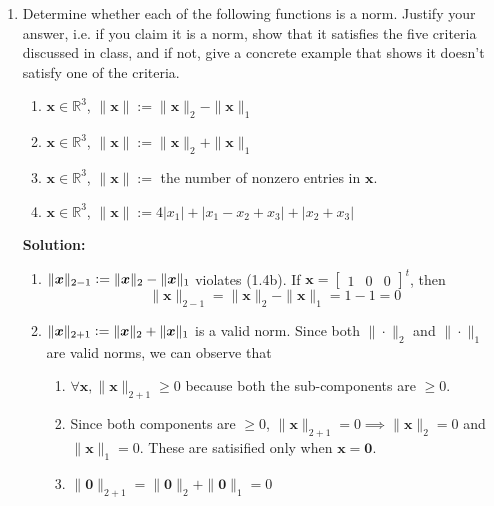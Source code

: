 \documentclass[]{article}
\newcommand{\R}{\mathbb{R}}
\newcommand{\bbm}{\begin{bmatrix}}
\newcommand{\ebm}{\end{bmatrix}}
\newcommand{\defeq}{\vcentcolon=}
\newcommand{\solution}{\vskip 0.5cm \textbf{\large Solution:} \\}
\begin{document}
\begin{enumerate}[resume]
  
\item Determine whether each of the following functions is a norm. Justify your answer, i.e. if you claim it is a norm, show that it satisfies the five criteria discussed in class, and if not, give a concrete example that shows it doesn't satisfy one of the criteria.
  
  \begin{enumerate}
  \item $\bm{x}\in\R^3$, $\|\bm{x}\| := \|\bm{x}\|_2-\|\bm{x}\|_1$
  \item $\bm{x}\in\R^3$, $\|\bm{x}\| := \|\bm{x}\|_2 + \|\bm{x}\|_1$
  \item $\bm{x}\in\R^3$, $\|\bm{x}\| := $ the number of nonzero entries in $\bm{x}$.
  \item $\bm{x}\in\R^3$, $\|\bm{x}\| := 4|x_1| + |x_1-x_2+x_3| + |x_2+x_3|$
  \end{enumerate}
  
  \solution
  \begin{enumerate}
  \item $\|\bm{x}\|_{2-1} \defeq \|\bm{x}\|_2-\|\bm{x}\|_1$ violates (1.4b). If $\bm{x} = \bbm 1 & 0 & 0 \ebm^t$, then
    \[
    \|\bm{x}\|_{2-1} = \|\bm{x}\|_2 - \|\bm{x}\|_1 = 1 - 1 = 0
    \]
    
  \item $\|\bm{x}\|_{2+1} \defeq \|\bm{x}\|_2 + \|\bm{x}\|_1$ is a
    valid norm. Since both $\|\cdot\|_2$ and $\|\cdot\|_1$ are valid
    norms, we can observe that
    \begin{enumerate}
    \item $\forall \bm{x}, \|\bm{x}\|_{2+1} \geq 0$ because
      both the sub-components are $\geq 0$.
    \item Since both components are $\geq 0$, $\|\bm{x}\|_{2+1}
      = 0 \implies \|\bm{x}\|_{2} = 0$ and $\|\bm{x}\|_{1} =
      0$. These are satisified only when $\bm{x} = \bm{0}$.
      
    \item $\|\bm{0}\|_{2+1} = \|\bm{0}\|_{2} + \|\bm{0}\|_{1} = 0$
      

\end{enumerate}
\end{enumerate}
\end{enumerate}
\end{document}
